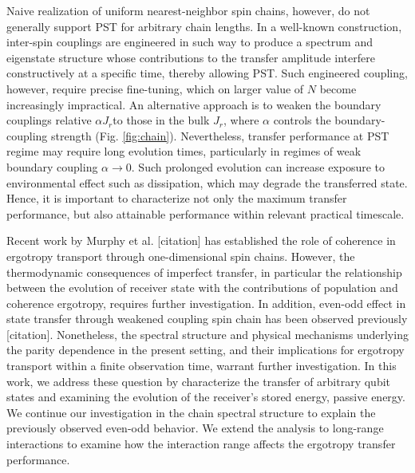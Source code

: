 \documentclass[../../../main.tex]{subfiles}
\begin{document}
Naive realization of uniform nearest-neighbor spin chains, however, do not generally support PST for arbitrary chain lengths.
In a well-known construction, inter-spin couplings are engineered in such way to produce a spectrum and eigenstate structure whose contributions to the transfer amplitude interfere constructively at a specific time, thereby allowing PST.
Such engineered coupling, however, require precise fine-tuning, which on larger value of $N$ become increasingly impractical.
An alternative approach is to weaken the boundary couplings relative $\alpha J_r$to those in the bulk $J_r$, where $\alpha$ controls the boundary-coupling strength (Fig. \ref{fig:chain}).
Nevertheless, transfer performance at PST regime may require long evolution times, particularly in regimes of weak boundary coupling $\alpha \to 0$.
Such prolonged evolution can increase exposure to environmental effect such as dissipation, which may degrade the transferred state.
Hence, it is important to characterize not only the maximum transfer performance, but also attainable performance within relevant practical timescale.

Recent work by Murphy et al. [citation] has established the role of coherence in ergotropy transport  through one-dimensional spin chains.
However, the thermodynamic consequences of imperfect transfer, in particular the relationship between the evolution of receiver state with the contributions of population and coherence ergotropy, requires further investigation.
In addition, even-odd effect in state transfer through weakened coupling spin chain has been observed previously [citation].
Nonetheless, the spectral structure and physical mechanisms underlying the parity dependence in the present setting, and their implications for ergotropy transport within a finite observation time, warrant further investigation.
In this work, we address these question by characterize the transfer of arbitrary qubit states and examining the evolution of the receiver's stored energy, passive energy.
We continue our investigation in the chain spectral structure to explain the previously observed even-odd behavior.
We extend the analysis to long-range interactions to examine how the interaction range affects the ergotropy transfer performance.
\end{document}
